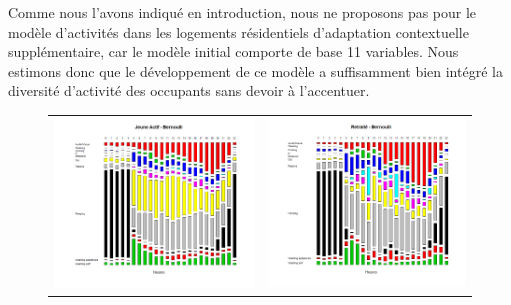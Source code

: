 Comme nous l'avons indiqué en introduction, nous ne proposons pas pour le modèle d'activités dans les logements résidentiels d'adaptation contextuelle supplémentaire, car le modèle initial comporte de base 11 variables. Nous estimons donc que le développement de ce modèle a suffisamment bien intégré la diversité d'activité des occupants sans devoir à l'accentuer. 

\begin{figure}[H]
\centering
\begin{tabular}{cc}
\includegraphics[scale=0.38]{Images/Activites/JeuneActifBernoulli} &
\includegraphics[scale=0.38]{Images/Activites/RetraiteBernoulli} \\

\end{tabular}
\end{figure}
